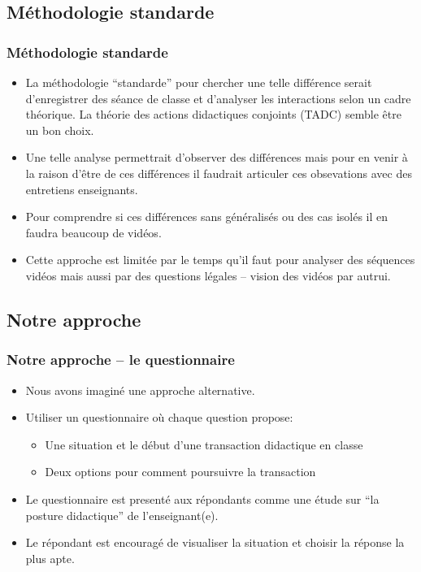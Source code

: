 \documentclass{beamer}
\begin{document}
\subsection{Méthodologie standarde}
\begin{frame}
\frametitle{Méthodologie standarde}
\begin{itemize}
\item La méthodologie ``standarde'' pour chercher une telle différence serait d'enregistrer des séance de classe et d'analyser
les interactions selon un cadre théorique. La théorie des actions didactiques conjoints (TADC) semble être un bon choix.
\item Une telle analyse permettrait d'observer des différences mais pour en venir à la raison d'être de ces différences il faudrait articuler ces obsevations avec des entretiens enseignants.
\item Pour comprendre si ces différences sans généralisés ou des cas isolés il en faudra beaucoup de vidéos.
\item Cette approche est limitée par le temps qu'il faut pour analyser des séquences vidéos mais aussi par des questions
légales -- vision des vidéos par autrui.  
\end{itemize}
\end{frame}

\subsection{Notre approche}
\begin{frame}
\frametitle{Notre approche -- le questionnaire}
\begin{itemize}
\item Nous avons imaginé une approche alternative.
\item Utiliser un questionnaire où chaque question propose:
  \begin{itemize}
   \item Une situation et le début d'une transaction didactique en classe
   \item Deux options pour comment poursuivre la transaction 
  \end{itemize}
\item Le questionnaire est presenté aux répondants comme une étude sur ``la posture didactique'' de l'enseignant(e).
\item Le répondant est encouragé de visualiser la situation et choisir la réponse la plus apte. 
\end{itemize}
\end{frame}
\end{document}
